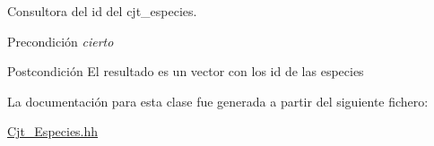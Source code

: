Consultora del id del cjt\+\_\+especies. 

\begin{DoxyPrecond}{Precondición}
{\itshape cierto} 
\end{DoxyPrecond}
\begin{DoxyPostcond}{Postcondición}
El resultado es un vector con los id de las especies 
\end{DoxyPostcond}


La documentación para esta clase fue generada a partir del siguiente fichero\+:\begin{DoxyCompactItemize}
\item 
\hyperlink{_cjt___especies_8hh}{Cjt\+\_\+\+Especies.\+hh}\end{DoxyCompactItemize}
